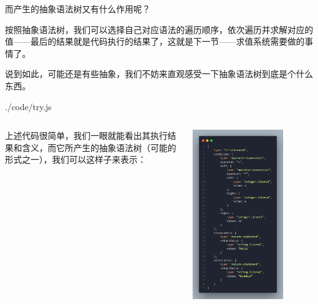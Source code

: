 \documentclass{beamer}
\begin{document}
	\begin{frame}
		而产生的抽象语法树又有什么作用呢？
		
		按照抽象语法树，我们可以选择自己对应语法的遍历顺序，依次遍历并求解对应的值——最后的结果就是代码执行的结果了，这就是下一节——求值系统需要做的事情了。
		
		说到如此，可能还是有些抽象，我们不妨来直观感受一下抽象语法树到底是个什么东西。
		
		
		{./code/try.js}
	\end{frame}
	\begin{frame}
		
		\begin{columns}
		上述代码很简单，我们一眼就能看出其执行结果和含义，而它所产生的抽象语法树（可能的形式之一），我们可以这样子来表示：
		
		\centering
		\includegraphics[width=0.75\textwidth]{pics/code1}
		\end{columns}
	\end{frame}
\end{document}

